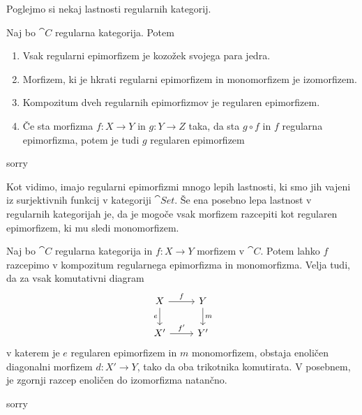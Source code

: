 \documentclass[../kategoricna_logika.tex]{subfiles}
\begin{document}
Poglejmo si nekaj lastnosti regularnih kategorij.
\begin{lema}
    Naj bo $\cat{C}$ regularna kategorija. Potem
    \begin{enumerate}[label=(\roman*), nosep]
        \item Vsak regularni epimorfizem je kozožek svojega para jedra.
        \item Morfizem, ki je hkrati regularni epimorfizem in monomorfizem je izomorfizem.
        \item Kompozitum dveh regularnih epimorfizmov je regularen epimorfizem.
        \item Če sta morfizma $f : X \to Y$ in $g : Y \to Z$ taka, da sta $g \circ f$ in $f$ regularna epimorfizma, potem je tudi $g$ regularen epimorfizem
    \end{enumerate}
\end{lema}
\begin{dokaz}
    sorry
\end{dokaz}

Kot vidimo, imajo regularni epimorfizmi mnogo lepih lastnosti, ki smo jih vajeni iz surjektivnih funkcij v kategoriji $\cat{Set}$. Še ena posebno lepa lastnost v regularnih kategorijah je, da je mogoče vsak morfizem razcepiti kot regularen epimorfizem, ki mu sledi monomorfizem.
\begin{lema}
    Naj bo $\cat{C}$ regularna kategorija in $f: X \to Y$ morfizem v $\cat{C}$.
    Potem lahko $f$ razcepimo v kompozitum regularnega epimorfizma in monomorfizma. Velja tudi, da za vsak komutativni diagram
    \begin{equation*}
        \begin{tikzcd}
            X \ar[d, "e"'] \ar[r, "f"] & Y \ar[d, "m"] \\
            X' \ar[r, "f'"] & Y'
        \end{tikzcd}
    \end{equation*}
    v katerem je $e$ regularen epimorfizem in $m$ monomorfizem, obstaja enoličen diagonalni morfizem $d : X' \to Y$, tako da oba trikotnika komutirata.
    V posebnem, je zgornji razcep enoličen do izomorfizma natančno.
\end{lema}
\begin{dokaz}
    sorry
\end{dokaz}
\end{document}
